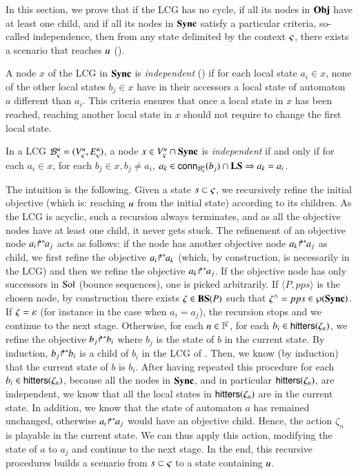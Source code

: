 In this section, we prove that if the LCG has no cycle, if all its nodes in $\mathbf{Obj}$ have at least one
child, and if all its nodes in $\mathbf{Sync}$ satisfy a
particular criteria, so-called independence, then from any state
delimited by the context $\varsigma$, there exists a scenario that reaches $u$
().

A node $x$ of the LCG in $\mathbf{Sync}$ is \emph{independent} () if for each local state
$a_i\in x$, none of the other local states $b_j\in x$ have in their accessors a local state of automaton $a$ different
than $a_i$.
This criteria ensures that once a local state in $x$ has been reached, reaching another local state
in $x$ should not require to change the first local state.

\begin{definition}
\label{def:coherent}
  In a LCG ${\mathcal{B}_{\varsigma}^{u}} = ({V_\varsigma^u}, {E_\varsigma^u})$,
  a node $x \in {V_\varsigma^u}\cap\mathbf{Sync}$ is \emph{independent} if and only if
  for each $a_i\in x$,
  for each $b_j\in x, b_j\neq a_i$,
  $a_k \in\mathsf{conn}_{{\mathcal{B}_{\varsigma}^{u}}}(b_j) \cap \mathbf{LS} \Rightarrow a_k = a_i$.
\end{definition}

The intuition is the following.
Given a state $s\subset\varsigma$, we recursively refine the initial objective
(which is: reaching $u$ from the initial state) according to its children.
As the LCG is acyclic, such a recursion always terminates, and as all the objective nodes have at
least one child, it never gets stuck.
The refinement of an objective node ${a_i\!\Rsh^*\!\!a_j}$ acts as follows:
if the node has another objective node ${a_k\!\Rsh^*\!\!a_j}$ as child, we first refine the objective
${a_i\!\Rsh^*\!\!a_k}$ (which, by construction, is necessarily in the LCG)
and then we refine the objective ${a_k\!\Rsh^*\!\!a_j}$.
If the objective node has only successors in $\mathrm{Sol}$ (bounce sequences), one is picked arbitrarily.
If $\langle P, pps\rangle$ is the chosen node,
by construction there exists $\zeta\in\mathbf{BS}(P)$ such that $\zeta^\wedge = pps \in \wp(\mathbf{Sync})$.
If $\zeta = \varepsilon$ (for instance in the case when $a_i = a_j$), the recursion stops and we
continue to the next stage.
Otherwise, for each $n\in\mathbb{I}^{\zeta}$,
for each $b_i \in\mathsf{hitters}(\zeta_n)$,
we refine the objective ${b_j\!\Rsh^*\!\!b_i}$ where $b_j$ is the state of $b$ in the current state.
By induction, ${b_j\!\Rsh^*\!\!b_i}$ is a child of $b_i$ in the LCG of .
Then, we know (by induction) that the current state of $b$ is $b_i$.
After having repeated this procedure for each $b_i\in\mathsf{hitters}(\zeta_n)$,
because all the nodes in $\mathbf{Sync}$, and in particular $\mathsf{hitters}(\zeta_n)$, are independent,
we know that all the local states in $\mathsf{hitters}(\zeta_n)$ are in the current state.
In addition, we know that the state of automaton $a$ has remained unchanged, otherwise
${a_i\!\Rsh^*\!\!a_j}$ would have an objective child.
Hence, the action $\zeta_n$ is playable in the current state.
We can thus apply this action, modifying the state of $a$ to $a_j$ and continue to the next stage.
In the end, this recursive procedures builds a scenario from $s\subset\varsigma$ to a state containing $u$.

